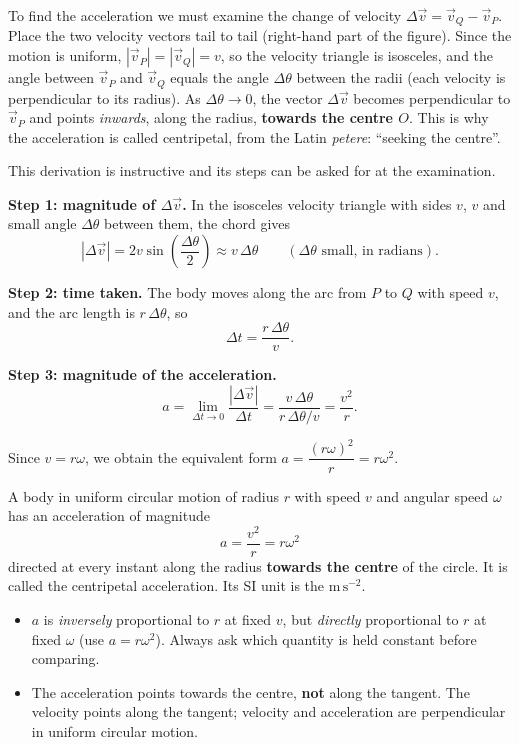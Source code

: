 \documentclass[11pt]{article}
\newcommand{\cle}[1]{{\popxbold\color{popdark}#1}}
\newcounter{popsec}
\newcounter{popsub}
\newcommand{\courssub}[1]{%
  \stepcounter{popsub}%
  \par\vspace{9pt}\noindent{\popxbold\fontsize{11.5}{13}\selectfont\color{popink}{\color{poporange}\thepopsec.\thepopsub}\hspace{6pt}#1}\par\nopagebreak\vspace{4pt}
}
\begin{document}
To find the acceleration we must examine the change of velocity $\Delta\vec{v} = \vec{v}_Q - \vec{v}_P$. Place the two velocity vectors tail to tail (right-hand part of the figure). Since the motion is uniform, $|\vec{v}_P| = |\vec{v}_Q| = v$, so the velocity triangle is isosceles, and the angle between $\vec{v}_P$ and $\vec{v}_Q$ equals the angle $\Delta\theta$ between the radii (each velocity is perpendicular to its radius). As $\Delta\theta \to 0$, the vector $\Delta\vec{v}$ becomes perpendicular to $\vec{v}_P$ and points \emph{inwards}, along the radius, \textbf{towards the centre $O$}. This is why the acceleration is called \cle{centripetal}, from the Latin \emph{petere}: ``seeking the centre''.

\courssub{Derivation of $a = \dfrac{v^{2}}{r}$}

This derivation is instructive and its steps can be asked for at the examination.

\textbf{Step 1: magnitude of $\Delta\vec{v}$.} In the isosceles velocity triangle with sides $v$, $v$ and small angle $\Delta\theta$ between them, the chord gives
\[
|\Delta\vec{v}| = 2v\sin\!\left(\frac{\Delta\theta}{2}\right) \approx v\,\Delta\theta \qquad (\Delta\theta \text{ small, in radians}).
\]

\textbf{Step 2: time taken.} The body moves along the arc from $P$ to $Q$ with speed $v$, and the arc length is $r\,\Delta\theta$, so
\[
\Delta t = \frac{r\,\Delta\theta}{v}.
\]

\textbf{Step 3: magnitude of the acceleration.}
\[
a = \lim_{\Delta t \to 0}\frac{|\Delta\vec{v}|}{\Delta t} = \frac{v\,\Delta\theta}{r\,\Delta\theta / v} = \frac{v^{2}}{r}.
\]

Since $v = r\omega$, we obtain the equivalent form $a = \dfrac{(r\omega)^{2}}{r} = r\omega^{2}$.

\begin{definition}
A body in uniform circular motion of radius $r$ with speed $v$ and angular speed $\omega$ has an acceleration of magnitude
\[
\boxed{\,a = \frac{v^{2}}{r} = r\omega^{2}\,}
\]
directed at every instant along the radius \textbf{towards the centre} of the circle. It is called the \cle{centripetal acceleration}. Its SI unit is the $\mathrm{m\,s^{-2}}$.
\end{definition}

\begin{attention}
\begin{itemize}
\item $a$ is \emph{inversely} proportional to $r$ at fixed $v$, but \emph{directly} proportional to $r$ at fixed $\omega$ (use $a = r\omega^{2}$). Always ask which quantity is held constant before comparing.
\item The acceleration points towards the centre, \textbf{not} along the tangent. The velocity points along the tangent; velocity and acceleration are perpendicular in uniform circular motion.
\end{itemize}
\end{attention}
\end{document}

